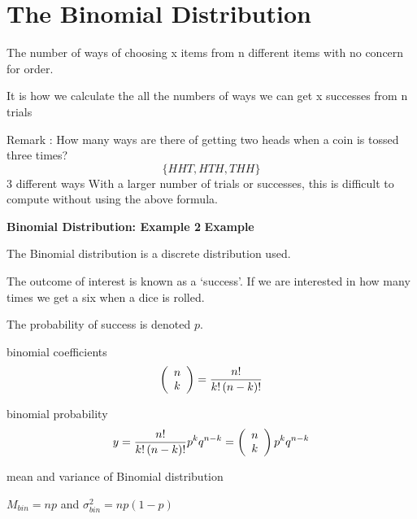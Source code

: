 \documentclass[a4paper,12pt]{article}
\begin{document}
\newpage
\section{The Binomial Distribution}


The number of ways of choosing x items from n different items with no concern for order.

It is how we calculate the all the numbers of ways we can get x successes from n trials

Remark : 
How many ways are there of getting two heads when a coin is tossed three times?
\[\{HHT,			HTH,			THH\}\]
3 different ways
With a larger number of trials or successes, this is difficult to compute without using the above formula.








\textbf{Binomial Distribution: Example 2}
\textbf{Example}




The Binomial distribution is a discrete distribution used.


The outcome of interest is known as a `success'. If we are
interested in how many times we get a six when a dice is rolled.

The probability of success is denoted $p$.

binomial coefficients
\[
\left( {\begin{array}{*{20}c} n \\ k \\ \end{array}} \right) =
\frac{{n!}}{{k!\left( {n - k} \right)!}} \]


binomial probability
\[y = \frac{{n!}}{{k!\left( {n - k} \right)!}}p^k q^{n - k} = \left( {\begin{array}{*{20}c} n \\ k \\ \end{array}} \right)p^k q^{n -
	k}\]

mean and variance of Binomial distribution

$M_{bin} = np$  and $\sigma ^2 _{bin} = np(1-p)$



\end{document}
